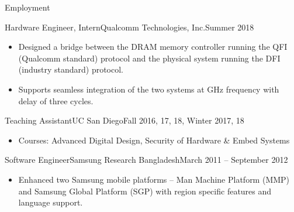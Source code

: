 \begin{cvsection}{Employment}
	\begin{cvsubsection}{Hardware Engineer, Intern}{Qualcomm Technologies, Inc.}{Summer 2018}			
		\begin{itemize}
			\item Designed a bridge between the DRAM memory controller running the QFI (Qualcomm standard) protocol and the physical system running the DFI (industry standard) protocol.
			\item Supports seamless integration of the two systems at GHz frequency with delay of three cycles.
		\end{itemize}
	\end{cvsubsection}
	\vspace{-0.3em}
	\begin{cvsubsection}{Teaching Assistant}{UC San Diego}{Fall 2016, 17, 18, Winter 2017, 18}	
		\begin{itemize}
			\item Courses: Advanced Digital Design, Security of Hardware \& Embed Systems
		\end{itemize}
	\end{cvsubsection}
	\vspace{-0.3em}
	\begin{cvsubsection}{Software Engineer}{Samsung Research Bangladesh}{March 2011 -- September 2012}		
		\begin{itemize}
			\item Enhanced two Samsung mobile platforms -- Man Machine Platform (MMP) and Samsung Global Platform (SGP) with region specific features and language support.
		\end{itemize}
	\end{cvsubsection}
\end{cvsection}
\vspace{-0.3em}
